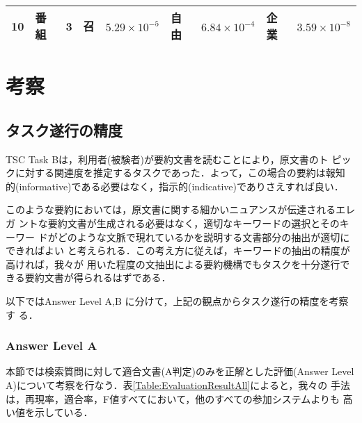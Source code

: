 \begin{table}[htbp]
\begin{center}
{\begin{tabular}{|r|ll|ll|ll|ll|}
 10	  & 番組           & \hspace{-2mm}3\hspace{-1.0mm} & 召             & \hspace{-2mm}$5.29\times 10^{-5}$\hspace{-1.5mm} & 自由    & \hspace{-2mm}$6.84\times 10^{-4}$\hspace{-1.5mm} & 企業            & \hspace{-2mm}$3.59\times 10^{-8}$\hspace{-1.5mm} \\
  \hline
\end{tabular}
}
\end{center}
\end{table}

\section{考察}


\subsection{タスク遂行の精度}

TSC Task Bは，利用者(被験者)が要約文書を読むことにより，原文書のト
ピックに対する関連度を推定するタスクであった．よって，この場合の要約は報知
的(informative)である必要はなく，指示的(indicative)でありさえすれば良い．

このような要約においては，原文書に関する細かいニュアンスが伝達されるエレガ
ントな要約文書が生成される必要はなく，適切なキーワードの選択とそのキーワー
ドがどのような文脈で現れているかを説明する文書部分の抽出が適切にできればよい
と考えられる．この考え方に従えば，キーワードの抽出の精度が高ければ，我々が
用いた程度の文抽出による要約機構でもタスクを十分遂行できる要約文書が得られるはずである．

以下ではAnswer Level A,B に分けて，上記の観点からタスク遂行の精度を考察す
る．

\subsubsection{Answer Level A}
\label{Sec:Answer Level A}

本節では検索質問に対して適合文書(A判定)のみを正解とした評価(Answer Level
A)について考察を行なう．表\ref{Table:EvaluationResultAll}によると，我々の
手法は，再現率，適合率，F値すべてにおいて，他のすべての参加システムよりも
高い値を示している．

